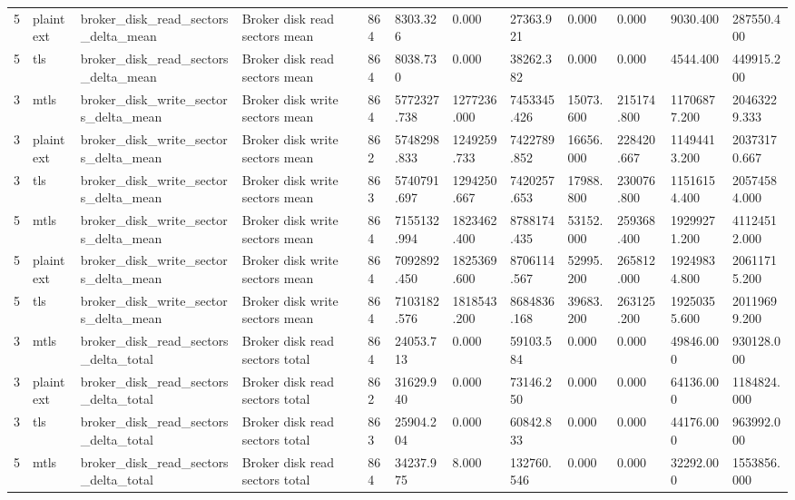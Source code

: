 \begin{longtable}{llllllllllll}
5 & plaintext & broker\_disk\_read\_sectors\_delta\_mean & Broker disk read sectors mean & 864 & 8303.326 & 0.000 & 27363.921 & 0.000 & 0.000 & 9030.400 & 287550.400 \\
5 & tls & broker\_disk\_read\_sectors\_delta\_mean & Broker disk read sectors mean & 864 & 8038.730 & 0.000 & 38262.382 & 0.000 & 0.000 & 4544.400 & 449915.200 \\
3 & mtls & broker\_disk\_write\_sectors\_delta\_mean & Broker disk write sectors mean & 864 & 5772327.738 & 1277236.000 & 7453345.426 & 15073.600 & 215174.800 & 11706877.200 & 20463229.333 \\
3 & plaintext & broker\_disk\_write\_sectors\_delta\_mean & Broker disk write sectors mean & 862 & 5748298.833 & 1249259.733 & 7422789.852 & 16656.000 & 228420.667 & 11494413.200 & 20373170.667 \\
3 & tls & broker\_disk\_write\_sectors\_delta\_mean & Broker disk write sectors mean & 863 & 5740791.697 & 1294250.667 & 7420257.653 & 17988.800 & 230076.800 & 11516154.400 & 20574584.000 \\
5 & mtls & broker\_disk\_write\_sectors\_delta\_mean & Broker disk write sectors mean & 864 & 7155132.994 & 1823462.400 & 8788174.435 & 53152.000 & 259368.400 & 19299271.200 & 41124512.000 \\
5 & plaintext & broker\_disk\_write\_sectors\_delta\_mean & Broker disk write sectors mean & 864 & 7092892.450 & 1825369.600 & 8706114.567 & 52995.200 & 265812.000 & 19249834.800 & 20611715.200 \\
5 & tls & broker\_disk\_write\_sectors\_delta\_mean & Broker disk write sectors mean & 864 & 7103182.576 & 1818543.200 & 8684836.168 & 39683.200 & 263125.200 & 19250355.600 & 20119699.200 \\
3 & mtls & broker\_disk\_read\_sectors\_delta\_total & Broker disk read sectors total & 864 & 24053.713 & 0.000 & 59103.584 & 0.000 & 0.000 & 49846.000 & 930128.000 \\
3 & plaintext & broker\_disk\_read\_sectors\_delta\_total & Broker disk read sectors total & 862 & 31629.940 & 0.000 & 73146.250 & 0.000 & 0.000 & 64136.000 & 1184824.000 \\
3 & tls & broker\_disk\_read\_sectors\_delta\_total & Broker disk read sectors total & 863 & 25904.204 & 0.000 & 60842.833 & 0.000 & 0.000 & 44176.000 & 963992.000 \\
5 & mtls & broker\_disk\_read\_sectors\_delta\_total & Broker disk read sectors total & 864 & 34237.975 & 8.000 & 132760.546 & 0.000 & 0.000 & 32292.000 & 1553856.000 \\

\end{longtable}
